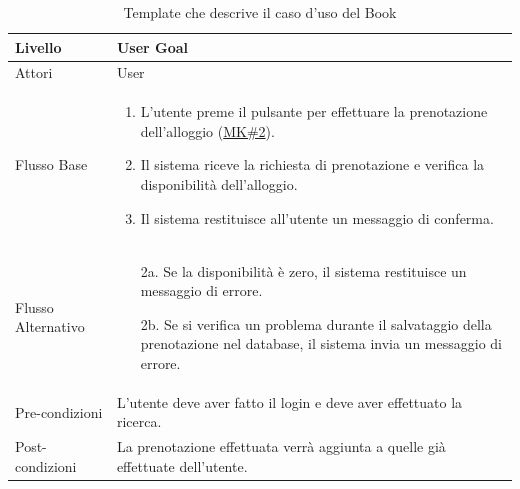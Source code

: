 \documentclass[10pt]{article}
\begin{document}
\begin{center}
\begin{table}[H]
{\begin{tabular}{|l|p{9cm}|}
Livello & User Goal \\ \hline
Attori & User \\ \hline
Flusso Base & 
\begin{enumerate}
    \item L'utente preme il pulsante per effettuare la prenotazione dell'alloggio (\hyperref[mk2]{MK\#2}).
    \item Il sistema riceve la richiesta di prenotazione e verifica la disponibilità dell'alloggio.
    \item Il sistema restituisce all'utente un messaggio di conferma.
\end{enumerate} \\ \hline
Flusso Alternativo & 
\begin{enumerate}
    \item[2a.] Se la disponibilità è zero, il sistema restituisce un messaggio di errore.
    \item[2b.] Se si verifica un problema durante il salvataggio della prenotazione nel database, il sistema invia un messaggio di errore.
\end{enumerate} \\ \hline
Pre-condizioni & L'utente deve aver fatto il login e deve aver effettuato la ricerca. \\ \hline
Post-condizioni & La prenotazione effettuata verrà aggiunta a quelle già effettuate dell'utente. \\ \hline
\end{tabular}
}
\caption{Template che descrive il caso d'uso del Book}
\end{table}
\begin{table}[H]
\vspace{-0.3cm}
\centering
{}
\end{table}
\end{center}
\end{document}
